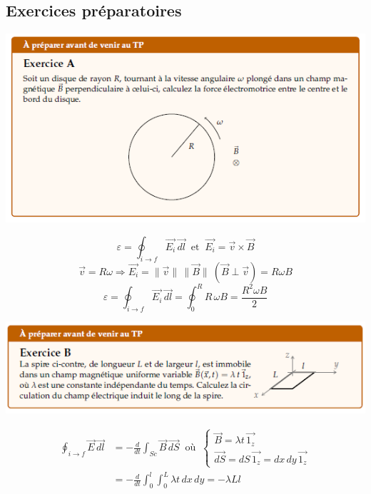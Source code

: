 \documentclass	[11pt, a4paper, openany]{book}
\begin{document}
	\subsection{Exercices préparatoires}
\begin{center}
\includegraphics[scale=1]{prepa/exoA.png}\\
\end{center}
$$\varepsilon=\oint_{i\rightarrow f}\vec{E_i}\,\vec{dl}\ \text{  et  }\  \vec{E_i}=\vec v\times\vec B$$
$$\vec v=R\omega\Rightarrow \vec{E_i}=\|\vec v\|\,\|\vec B\|\  (\vec{B} \perp \vec{v})=R\omega B$$
$$\varepsilon=\oint_{i\rightarrow f}\vec{E_i}\,\vec{dl}=\oint_0^RR\,\omega B=\frac{R^2\omega B}{2}$$
\begin{center}
\includegraphics[scale=1]{prepa/exoB.png}\\
\end{center}
\begin{align*}\oint_{i\rightarrow f}\vec{E}\,\vec{dl} & =-\frac{d}{dt}\int_{Sc}\vec B\,\vec{dS}\ \text{ où }\ \left\{\begin{array}{l}
\vec B=\lambda t\,\vec{1_z}\\
\vec{dS}=dS\,\vec{1_z}=dx\,dy\,\vec{1_z}\end{array}\right.\\
 & =-\frac{d}{dt}\int_0^l\int_0^L\lambda t\,dx\,dy=-\lambda L l\end{align*}
\end{document}
